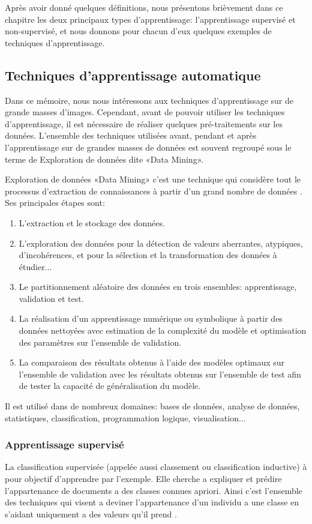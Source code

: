 \documentclass[12pt]{article}
\begin{document}
Après avoir donné quelques définitions, nous présentons brièvement dans ce chapitre les deux principaux types d'apprentissage: l'apprentissage supervisé et non-supervisé, et nous donnons pour chacun d'eux quelques exemples de techniques d'apprentissage.
\subsection{Techniques d'apprentissage automatique}
Dans ce mémoire, nous nous intéressons aux techniques d'apprentissage sur de grande masses d'images. Cependant, avant de pouvoir utiliser les techniques d'apprentissage, il est nécessaire de réaliser quelques pré-traitements sur les données. L'ensemble des techniques utilisées avant, pendant et après l'apprentissage sur de grandes masses de données est souvent regroupé sous le terme de Exploration de données dite «Data Mining».

Exploration de données «Data Mining» c’est une technique qui considère tout le processus d'extraction de connaissances à partir d'un grand nombre de données \cite{1}.\\
Ses principales étapes sont:
\begin{enumerate}
  	  \item L'extraction et le stockage des données.
  	  \item L'exploration des données pour la détection de valeurs aberrantes, atypiques, d'incohérences, et pour la sélection et la transformation des données à étudier...
  	\item Le partitionnement aléatoire des données en trois ensembles: apprentissage, validation et test.
  	\item La réalisation d'un apprentissage numérique ou symbolique à partir des données nettoyées avec estimation de la complexité du modèle et optimisation des paramètres sur l'ensemble de validation.
  	\item La comparaison des résultats obtenus à l'aide des modèles optimaux sur l'ensemble de validation avec les résultats obtenus sur l'ensemble de test afin de tester la capacité de généralisation du modèle.\\
\end{enumerate}

Il est utilisé dans de nombreux domaines: bases de données, analyse de données, statistiques, classification, programmation logique, visualisation...
\subsubsection{Apprentissage supervisé}
La classification supervisée (appelée aussi classement ou classification inductive) à pour objectif d'apprendre par l'exemple. Elle cherche a expliquer et prédire l’appartenance de documents a des classes connues apriori. Ainsi c'est l'ensemble des techniques qui visent a deviner l'appartenance d'un individu a une classe en s'aidant uniquement a des valeurs qu'il prend \cite{2}.
\end{document}
